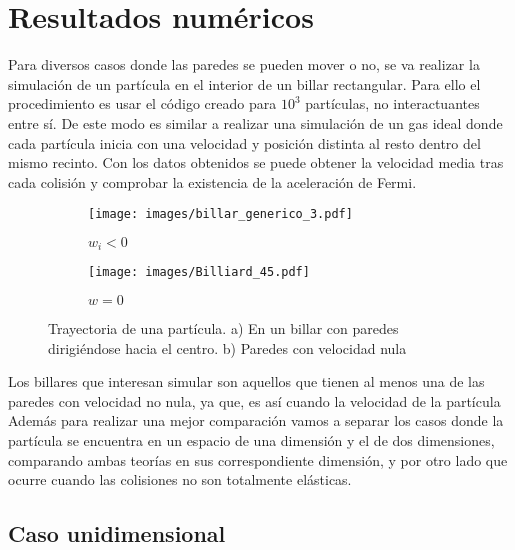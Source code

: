 %

%

\chapter{Resultados numéricos}

Para diversos casos donde las paredes se pueden mover o no, se va realizar la simulación de un partícula en el interior de un billar rectangular. Para ello el procedimiento es usar el código creado \cite{MiCodigo} para \( 10^3 \) partículas, no interactuantes entre sí. De este modo es similar a realizar una simulación de un gas ideal donde cada partícula inicia con una velocidad y posición distinta al resto dentro del mismo recinto. Con los datos obtenidos se puede obtener la velocidad media tras cada colisión y comprobar la existencia de la aceleración de Fermi.

\begin{figure}[H]
    \begin{subfigure}[b]{0.5\textwidth}
        \centering
        \texttt{[image: images/billar\_generico\_3.pdf]}
        \caption{$w_i<0$}
        \label{fig:a}
    \end{subfigure}
    \hfill
    \begin{subfigure}[b]{0.5\textwidth}
        \centering
        \texttt{[image: images/Billiard\_45.pdf]}
        \caption{$w=0$}
        \label{fig:s}
    \end{subfigure}
    \caption{Trayectoria de una partícula. a) En un billar con paredes dirigiéndose hacia el centro. b) Paredes con velocidad nula}
\end{figure}


Los billares que interesan simular son aquellos que tienen al menos una de las paredes con velocidad no nula, ya que, es así cuando la velocidad de la partícula  Además para realizar una mejor comparación vamos a separar los casos donde la partícula se encuentra en un espacio de una dimensión y el de dos dimensiones, comparando ambas teorías en sus correspondiente dimensión, y por otro lado que ocurre cuando las colisiones no son totalmente elásticas.

\section{Caso unidimensional}

